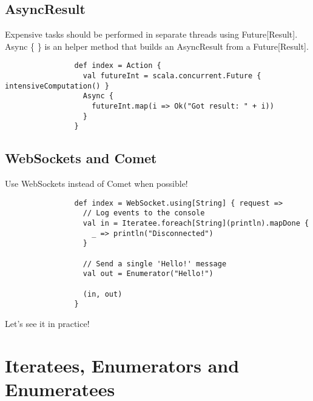 \documentclass{beamer}
\begin{document}
	\subsection{AsyncResult}
		\begin{frame}[fragile]
			Expensive tasks should be performed in separate threads using Future[Result].
			Async \{ \} is an helper method that builds an AsyncResult from a Future[Result].


			\begin{lstlisting}
				def index = Action {
				  val futureInt = scala.concurrent.Future { intensiveComputation() }
				  Async {
				    futureInt.map(i => Ok("Got result: " + i))
				  }
				}
			\end{lstlisting}
		\end{frame}

	\subsection{WebSockets and Comet}
		\begin{frame}[fragile]
			Use WebSockets instead of Comet when possible!

			\begin{lstlisting}
				def index = WebSocket.using[String] { request =>
				  // Log events to the console
				  val in = Iteratee.foreach[String](println).mapDone {
				    _ => println("Disconnected")
				  }

				  // Send a single 'Hello!' message
				  val out = Enumerator("Hello!")

				  (in, out)
				}
			\end{lstlisting}

			\pause Let's see it in practice!
		\end{frame}

\section{Iteratees, Enumerators and Enumeratees}
\end{document}
